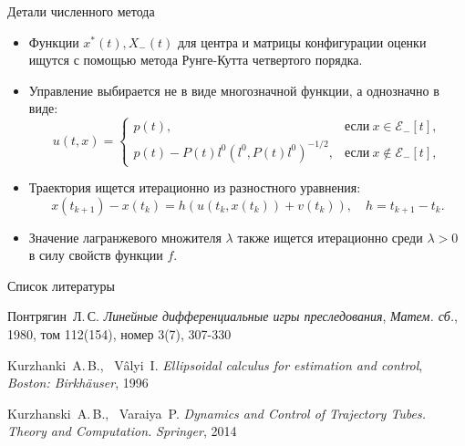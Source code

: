 \documentclass{beamer}
\begin{document}
\begin{frame}{Детали численного метода}
\begin{itemize}
    \item Функции \( x^*(t), X_-(t) \) для центра и матрицы конфигурации оценки ищутся с помощью метода Рунге-Кутта четвертого порядка.
    \item Управление выбирается не в виде многозначной функции, а однозначно в виде:
    \begin{equation*}
        u(t,x) = 
        \begin{cases}
            p(t), & \text{если} \ x \in \mathcal{E}_-[t], \\
            p(t) - P(t)l^0(l^0, P(t)l^0)^{-1/2}, & \text{если} \ x \notin \mathcal{E}_-[t],
        \end{cases}
    \end{equation*}
    \item Траектория ищется итерационно из разностного уравнения:
        \begin{equation*}
            x(t_{k+1}) - x(t_k) = h(u(t_k, x(t_k)) + v(t_k)), \quad h = t_{k+1} - t_k.
        \end{equation*}
    \item Значение лагранжевого множителя \( \lambda \) также ищется итерационно среди \( \lambda > 0 \) в силу свойств функции \( f \).
\end{itemize}
    
\end{frame}

\begin{frame}{Список литературы}
    \begin{thebibliography}{0}
	 Понтрягин~Л.\,С.
	\emph{Линейные дифференциальные игры преследования}, \emph{Матем. сб.}, 1980, том 112(154), номер 3(7), 307-330
	
	 Kurzhanki~A.\,B., \ Vâlyi~I.
	\emph{Ellipsoidal calculus for estimation and control}, \emph{Boston: Birkhäuser}, 1996
	
	Kurzhanski~A.\,B., \ Varaiya~P. \emph{Dynamics and Control of Trajectory Tubes. Theory and Computation.} \emph{Springer}, 2014
	
\end{thebibliography}
\end{frame}
\end{document}
